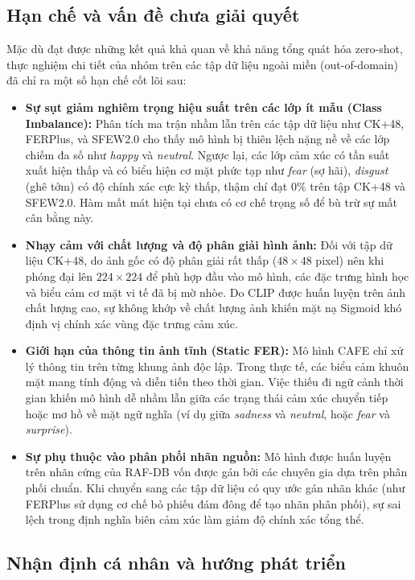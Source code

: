 \subsection{Hạn chế và vấn đề chưa giải quyết}

Mặc dù đạt được những kết quả khả quan về khả năng tổng quát hóa zero-shot, thực nghiệm chi tiết của nhóm trên các tập dữ liệu ngoài miền (out-of-domain) đã chỉ ra một số hạn chế cốt lõi sau:

\begin{itemize}
    \item \textbf{Sự sụt giảm nghiêm trọng hiệu suất trên các lớp ít mẫu (Class Imbalance):} Phân tích ma trận nhầm lẫn trên các tập dữ liệu như CK+48, FERPlus, và SFEW2.0 cho thấy mô hình bị thiên lệch nặng nề về các lớp chiếm đa số như \textit{happy} và \textit{neutral}. Ngược lại, các lớp cảm xúc có tần suất xuất hiện thấp và có biểu hiện cơ mặt phức tạp như \textit{fear} (sợ hãi), \textit{disgust} (ghê tởm) có độ chính xác cực kỳ thấp, thậm chí đạt $0\%$ trên tập CK+48 và SFEW2.0. Hàm mất mát hiện tại chưa có cơ chế trọng số để bù trừ sự mất cân bằng này.
    \item \textbf{Nhạy cảm với chất lượng và độ phân giải hình ảnh:} Đối với tập dữ liệu CK+48, do ảnh gốc có độ phân giải rất thấp ($48 \times 48$ pixel) nên khi phóng đại lên $224 \times 224$ để phù hợp đầu vào mô hình, các đặc trưng hình học và biểu cảm cơ mặt vi tế đã bị mờ nhòe. Do CLIP được huấn luyện trên ảnh chất lượng cao, sự không khớp về chất lượng ảnh khiến mặt nạ Sigmoid khó định vị chính xác vùng đặc trưng cảm xúc.
    \item \textbf{Giới hạn của thông tin ảnh tĩnh (Static FER):} Mô hình CAFE chỉ xử lý thông tin trên từng khung ảnh độc lập. Trong thực tế, các biểu cảm khuôn mặt mang tính động và diễn tiến theo thời gian. Việc thiếu đi ngữ cảnh thời gian khiến mô hình dễ nhầm lẫn giữa các trạng thái cảm xúc chuyển tiếp hoặc mơ hồ về mặt ngữ nghĩa (ví dụ giữa \textit{sadness} và \textit{neutral}, hoặc \textit{fear} và \textit{surprise}).
    \item \textbf{Sự phụ thuộc vào phân phối nhãn nguồn:} Mô hình được huấn luyện trên nhãn cứng của RAF-DB vốn được gán bởi các chuyên gia dựa trên phân phối chuẩn. Khi chuyển sang các tập dữ liệu có quy ước gán nhãn khác (như FERPlus sử dụng cơ chế bỏ phiếu đám đông để tạo nhãn phân phối), sự sai lệch trong định nghĩa biên cảm xúc làm giảm độ chính xác tổng thể.
\end{itemize}

\subsection{Nhận định cá nhân và hướng phát triển}

